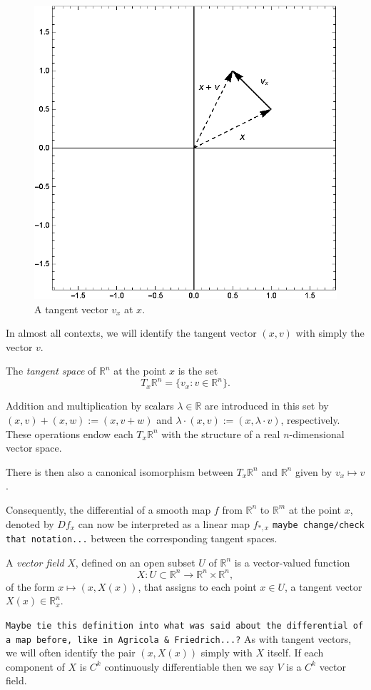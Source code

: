 \begin{figure}[h!]
\centering
\includegraphics[scale=0.55]{fig/chp2-fig0-c}
\caption{A tangent vector $v_x$ at $x$.}
\end{figure}

In almost all contexts, we will identify the tangent vector $(x,v)$ with simply the vector $v$.

\begin{definition}
The \textit{tangent space} of $\mathbb{R}^n$ at the point $x$ is the set
\[
T_x\mathbb{R}^n=\{v_x:v\in\mathbb{R}^n\}.
\]
\end{definition}
\noindent Addition and multiplication by scalars $\lambda\in\mathbb{R}$ are introduced in this set by $(x,v)+(x,w):=(x,v+w)$ and $\lambda\cdot(x,v):=(x,\lambda\cdot v)$, respectively. These operations endow each $T_x\mathbb{R}^n$ with the structure of a real $n$-dimensional vector space.

There is then also a canonical isomorphism between $T_x\mathbb{R}^n$ and $\mathbb{R}^n$ given by $v_x\mapsto v$.

Consequently, the differential of a smooth map $f$ from $\mathbb{R}^n$ to $\mathbb{R}^m$ at the point $x$, denoted by $Df_x$ can now be interpreted as a linear map $f_{*,x}$ \texttt{maybe change/check that notation...} between the corresponding tangent spaces.

\begin{definition}
A \textit{vector field} $X$, defined on an open subset $U$ of $\mathbb{R}^n$ is a vector-valued function
\[
X:U\subset\mathbb{R}^n\to\mathbb{R}^n\times\mathbb{R}^n,
\]
of the form $x\mapsto (x,X(x))$, that assigns to each point $x\in U$, a tangent vector $X(x)\in\mathbb{R}^n_x$.
\end{definition}
\noindent \texttt{Maybe tie this definition into what was said about the differential of a map before, like in Agricola \& Friedrich...?}
\noindent As with tangent vectors, we will often identify the pair $(x,X(x))$ simply with $X$ itself.
If each component of $X$ is $C^k$ continuously differentiable then we say $V$ is a $C^k$ vector field. 


